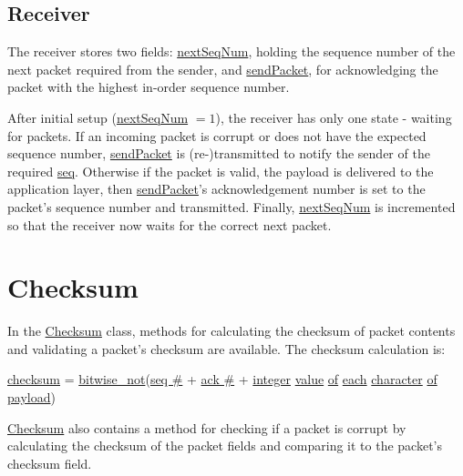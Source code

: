 \documentclass[a4paper]{article}
\newcommand{\code}{\url}
\begin{document}
\subsection{Receiver}

The receiver stores two fields: \code{nextSeqNum}, holding the sequence number of the next packet required from the sender, and \code{sendPacket}, for acknowledging the packet with the highest in-order sequence number.

After initial setup (\code{nextSeqNum} $=1$), the receiver has only one state - waiting for packets. If an incoming packet is corrupt or does not have the expected sequence number, \code{sendPacket} is (re-)transmitted to notify the sender of the required \code{seq}. Otherwise if the packet is valid, the payload is delivered to the application layer, then \code{sendPacket}'s acknowledgement number is set to the packet's sequence number and transmitted. Finally, \code{nextSeqNum} is incremented so that the receiver now waits for the correct next packet.

\section{Checksum}

In the \code{Checksum} class, methods for calculating the checksum of packet contents and validating a packet's checksum are available. The checksum calculation is:

\code{checksum} = \code{bitwise_not}(\code{seq #} + \code{ack #} + \code{integer} \code{value} \code{of} \code{each} \code{character} \code{of} \code{payload})

\noindent \code{Checksum} also contains a method for checking if a packet is corrupt by calculating the checksum of the packet fields and comparing it to the packet's checksum field.
\end{document}
